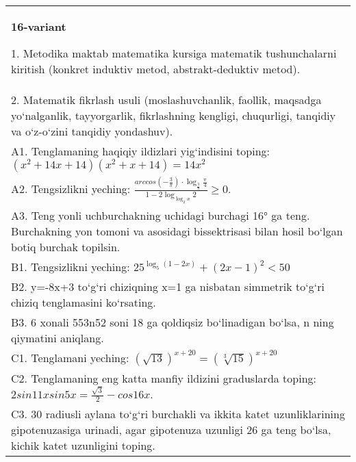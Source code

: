 \documentclass{article}
\begin{document}
\begin{tabular}{m{17cm}}
\textbf{16-variant}

1. Metodika maktab matematika kursiga matematik tushunchalarni kiritish (konkret induktiv metod, abstrakt-deduktiv metod). \\
2. Matematik fikrlash usuli (moslashuvchanlik, faollik, maqsadga yo‘nalganlik, tayyorgarlik, fikrlashning kengligi, chuqurligi, tanqidiy va o‘z-o‘zini tanqidiy yondashuv). \\
A1. Tenglamaning haqiqiy ildizlari yig‘indisini toping: \((x^2 + 14x + 14) (x^2 + x + 14) = 14x^2\) \\
A2. Tengsizlikni yeching: \(\frac{arccos (- \frac{3}{\pi}) \cdot \log_{\frac{3}{\pi}}\frac{\pi}{4}}{1 - 2\log_{\log_{2}x}2} \geq 0\). \\
A3. Teng yonli uchburchakning uchidagi burchagi 16° ga teng. Burchakning yon tomoni va asosidagi bissektrisasi bilan hosil bo‘lgan botiq burchak topilsin. \\
B1. Tengsizlikni yeching: \(25^{\log_{5}{ (1 - 2x) }} + { (2x - 1) }^{2} < 50\) \\
B2. y=-8x+3 to‘g‘ri chiziqning x=1 ga nisbatan simmetrik to‘g‘ri chiziq tenglamasini ko‘rsating. \\
B3. 6 xonali 553n52 soni 18 ga qoldiqsiz bo‘linadigan bo‘lsa, n ning qiymatini aniqlang. \\
C1. Tenglamani yeching: \((\sqrt{13}) ^{x + 20} = (\sqrt[3]{15}) ^{x + 20}\) \\
C2. Tenglamaning eng katta manfiy ildizini graduslarda toping: \(2sin11xsin5x = \frac{\sqrt{3}}{2} - cos16x\). \\
C3. 30 radiusli aylana to‘g‘ri burchakli va ikkita katet uzunliklarining gipotenuzasiga urinadi, agar gipotenuza uzunligi 26 ga teng bo‘lsa, kichik katet uzunligini toping. \\

\end{tabular}
\vspace{1cm}
\end{document}
